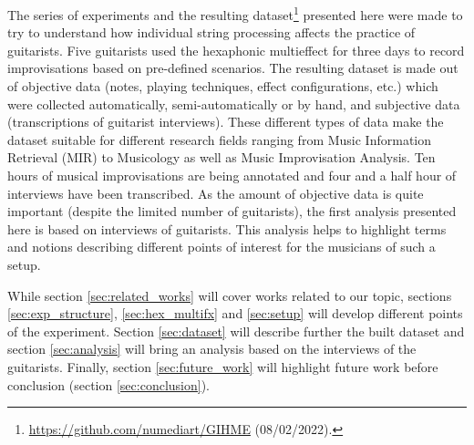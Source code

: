 \documentclass{article}
\begin{document}
The series of experiments and the resulting dataset\footnote{\url{https://github.com/numediart/GIHME} (08/02/2022).} presented here were made to try to understand how individual string processing affects the practice of guitarists.  Five guitarists used the hexaphonic multieffect for three days to record improvisations based on pre-defined scenarios.
The resulting dataset is made out of objective data (notes, playing techniques, effect configurations, etc.) which were collected automatically, semi-automatically or by hand, and subjective data (transcriptions of guitarist interviews).  These different types of data make the dataset suitable for different research fields ranging from Music Information Retrieval (MIR) to Musicology as well as Music Improvisation Analysis. Ten hours of musical improvisations are being annotated and four and a half hour of interviews have been transcribed. As the amount of objective data is quite important (despite the limited number of guitarists), the first analysis presented here is based on interviews of guitarists. This analysis helps to highlight terms and notions describing different points of interest for the musicians of such a setup. 



While section \ref{sec:related_works} will cover works related to our topic, sections \ref{sec:exp_structure}, \ref{sec:hex_multifx} and \ref{sec:setup} will develop different points of the experiment. Section \ref{sec:dataset} will describe further the built dataset and section \ref{sec:analysis} will bring an analysis based on the interviews of the guitarists.
Finally, section \ref{sec:future_work} will highlight future work before conclusion (section \ref{sec:conclusion}).

\end{document}
